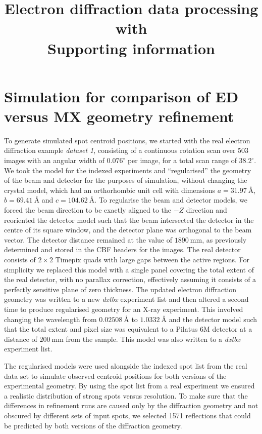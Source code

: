 \documentclass{article}
\title{Electron diffraction data processing with \dials \\
  \large Supporting information}
\date{}
\newcommand{\dxtbx}{\emph{dxtbx}\xspace}
\begin{document}
\maketitle

\section{Simulation for comparison of ED versus MX geometry refinement}

To generate simulated spot centroid positions, we started with the real electron
diffraction example \emph{dataset 1}, consisting of a continuous rotation scan over 503 images with
an angular width of $0.076^\circ$ per image, for a total scan range of
$38.2^\circ$. We took the model for the indexed experiments and ``regularised''
the geometry of the beam and detector for the purposes of simulation, without
changing the crystal model, which had an orthorhombic unit cell with dimensions
$a=\SI{31.97}{\angstrom}$, $b=\SI{69.41}{\angstrom}$ and
$c=\SI{104.62}{\angstrom}$. To regularise the beam and detector models, we
forced the beam direction to be exactly aligned to the $-Z$ direction and
reoriented the detector model such that the beam intersected the detector in
the centre of its square window, and the detector plane was orthogonal to the
beam vector. The detector distance remained at the value of
$\SI{1890}{\milli\metre}$, as previously determined and stored in the CBF headers
for the images. The real detector consists of $2\times2$ Timepix quads with
large gaps between the active regions. For simplicity we replaced this model
with a single panel covering the total extent of the real detector, with
no parallax correction, effectively assuming it consists of a perfectly
sensitive plane of zero thickness. The updated electron diffraction geometry
was written to a new \dxtbx experiment list and then altered a second time to
produce regularised geometry for an X-ray experiment. This involved changing
the wavelength from $\SI{0.02508}{\angstrom}$ to $\SI{1.0332}{\angstrom}$ and the
detector model such that the total extent and pixel size was equivalent to a
Pilatus 6M detector at a distance of $\SI{200}{\milli\metre}$ from the sample.
This model was also written to a \dxtbx experiment list.

The regularised models were used alongside the indexed spot list from the
real data set to simulate observed centroid positions for both versions of the
experimental geometry. By using the spot list from a real experiment we ensured
a realistic distribution of strong spots versus resolution. To make sure
that the differences in refinement runs are caused only by the
diffraction geometry and not obscured by different sets of input spots, we
selected 1571 reflections that could be predicted by both versions of the
diffraction geometry.
\end{document}

